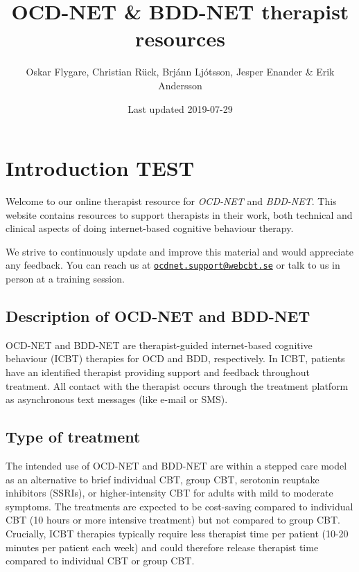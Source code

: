 \documentclass[]{book}
\title{OCD-NET \& BDD-NET therapist resources}
\author{Oskar Flygare, Christian Rück, Brjánn Ljótsson, Jesper Enander \& Erik Andersson}
\date{Last updated 2019-07-29}
\begin{document}
\maketitle

{
\setcounter{tocdepth}{1}
\tableofcontents
}
\hypertarget{introduction-test}{%
\chapter{Introduction TEST}\label{introduction-test}}

Welcome to our online therapist resource for \emph{OCD-NET} and \emph{BDD-NET}. This website contains resources to support therapists in their work, both technical and clinical aspects of doing internet-based cognitive behaviour therapy.

We strive to continuously update and improve this material and would appreciate any feedback. You can reach us at \href{mailto:ocdnet.support@webcbt.se}{\nolinkurl{ocdnet.support@webcbt.se}} or talk to us in person at a training session.

\hypertarget{description-of-ocd-net-and-bdd-net}{%
\section{Description of OCD-NET and BDD-NET}\label{description-of-ocd-net-and-bdd-net}}

OCD-NET and BDD-NET are therapist-guided internet-based cognitive behaviour (ICBT) therapies for OCD and BDD, respectively. In ICBT, patients have an identified therapist providing support and feedback throughout treatment. All contact with the therapist occurs through the treatment platform as asynchronous text messages (like e-mail or SMS).

\hypertarget{type-of-treatment}{%
\section{Type of treatment}\label{type-of-treatment}}

The intended use of OCD-NET and BDD-NET are within a stepped care model as an alternative to brief individual CBT, group CBT, serotonin reuptake inhibitors (SSRIs), or higher-intensity CBT for adults with mild to moderate symptoms. The treatments are expected to be cost-saving compared to individual CBT (10 hours or more intensive treatment) but not compared to group CBT. Crucially, ICBT therapies typically require less therapist time per patient (10-20 minutes per patient each week) and could therefore release therapist time compared to individual CBT or group CBT.
\end{document}
